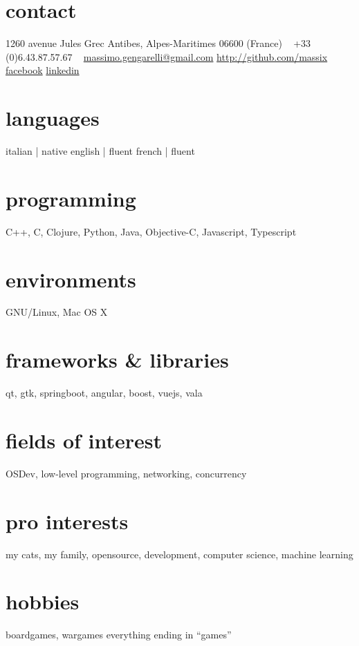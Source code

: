 \documentclass[]{friggeri-cv}
\begin{document}


\begin{aside} %
  \section{contact}
  1260 avenue Jules Grec
  Antibes, Alpes-Maritimes
  06600 (France)
  ~
  +33 (0)6.43.87.57.67
  ~
  \href{mailto:massimo.gengarelli@gmail.com}{massimo.gengarelli@gmail.com}
  \href{https://github.com/massix/}{http://github.com/massix}
  \href{https://facebook.com/massimo.gengarelli}{facebook}
  \href{https://fr.linkedin.com/pub/massimo-gengarelli/46/375/468/}{linkedin}
  \section{languages}
  italian | native
  english | fluent
  french  | fluent
  \section{programming}
  C++, C, Clojure, Python,
  Java, Objective-C,
  Javascript, Typescript
  \section{environments}
  GNU/Linux, Mac OS X
  \section{frameworks \& libraries}
  qt, gtk, springboot, angular,
  boost, vuejs, vala
  \section{fields of interest}
  OSDev, low-level programming,
  networking, concurrency
  \section{pro interests}
  my cats, my family, opensource,
  development, computer science,
  machine learning
  \section{hobbies}
  boardgames, wargames
  everything ending in ``games''
\end{aside}
\end{document}
